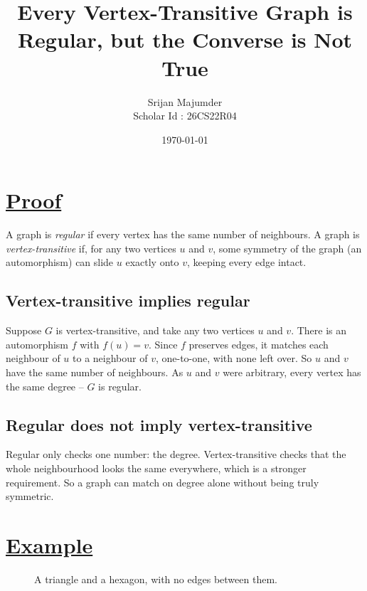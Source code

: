 \documentclass[11pt]{article}
\title{Every Vertex-Transitive Graph is Regular, but the Converse is Not True}
\author{Srijan Majumder \\ Scholar Id : 26CS22R04 }
\date{\today}
\begin{document}
\maketitle

\section*{\underline{Proof}}

A graph is \emph{regular} if every vertex has the same number of neighbours. A graph is \emph{vertex-transitive} if, for any two vertices $u$ and $v$, some symmetry of the graph (an automorphism) can slide $u$ exactly onto $v$, keeping every edge intact.

\subsection*{Vertex-transitive implies regular}

Suppose $G$ is vertex-transitive, and take any two vertices $u$ and $v$. There is an automorphism $f$ with $f(u) = v$. Since $f$ preserves edges, it matches each neighbour of $u$ to a neighbour of $v$, one-to-one, with none left over. So $u$ and $v$ have the same number of neighbours. As $u$ and $v$ were arbitrary, every vertex has the same degree -- $G$ is regular.

\subsection*{Regular does not imply vertex-transitive}

Regular only checks one number: the degree. Vertex-transitive checks that the whole neighbourhood looks the same everywhere, which is a stronger requirement. So a graph can match on degree alone without being truly symmetric.

\section*{\underline{Example}}

\begin{figure}[h]
\centering
{}
\caption{A triangle and a hexagon, with no edges between them.}
\end{figure}
\end{document}
